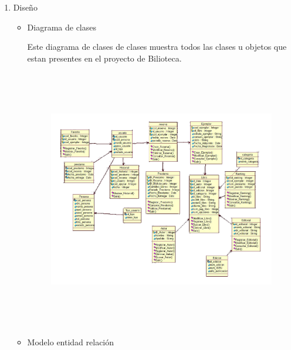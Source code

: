 \documentclass[12pt]{article}
\begin{document}
\begin{enumerate}[label*=\arabic*.]
\begin{enumerate}[label*=\arabic*.]
\begin{itemize}

\par

\end{itemize}\par

	\item Diseño\par

\begin{itemize}

	\item Diagrama de clases \par

 Este diagrama de clases de clases muestra todos las clases u objetos que estan presentes en el proyecto de Bilioteca.


\begin{figure}[H]
	\begin{Center}
		\includegraphics[width=5.85in,height=4.50in]{./media/figura3.jpg}
	\end{Center}
\end{figure}



\par

	\item Modelo entidad relación  


\end{itemize}
\end{enumerate}
\end{enumerate}
\end{document}
